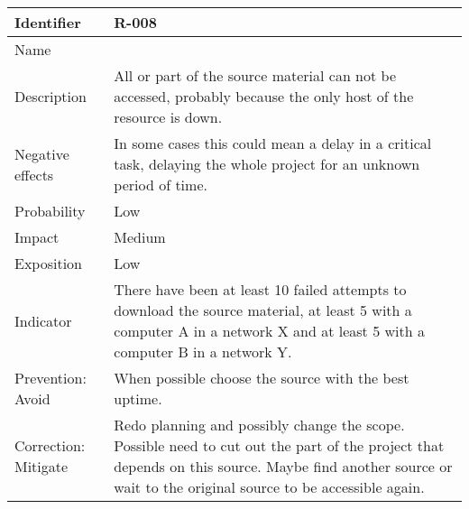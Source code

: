 \begin{table}[H]
	\begin{tabularx}{\textwidth}{|y|z|}
		\hline
		Identifier & \textbf{R-008} \\ \hline
		Name & \Rocho \\ \hline
		Description &
			All or part of the source material can not be accessed, probably because the only host of the resource is down.
		\\ \hline
		Negative effects &
			In some cases this could mean a delay in a critical task, delaying the whole project for an unknown period of time.
		\\ \hline
		Probability & Low\\ \hline
		Impact & Medium\\ \hline
		Exposition & Low\\ \hline
		Indicator & There have been at least 10 failed attempts to download the source material, at least 5 with a computer A in a network X and at least 5 with a computer B in a network Y.\\ \hline
		Prevention: Avoid &
			When possible choose the source with the best uptime.
		\\ \hline
		Correction: Mitigate &
			Redo planning and possibly change the scope. \linej
			Possible need to cut out the part of the project that depends on this source. \linej
			Maybe find another source or wait to the original source to be accessible again.
		\\ \hline
	\end{tabularx}
\end{table}

